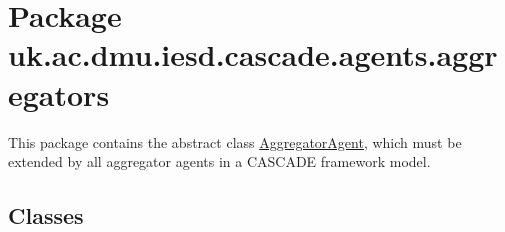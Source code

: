\hypertarget{namespaceuk_1_1ac_1_1dmu_1_1iesd_1_1cascade_1_1agents_1_1aggregators}{\section{Package uk.\-ac.\-dmu.\-iesd.\-cascade.\-agents.\-aggregators}
\label{namespaceuk_1_1ac_1_1dmu_1_1iesd_1_1cascade_1_1agents_1_1aggregators}
}


This package contains the abstract class \hyperlink{classuk_1_1ac_1_1dmu_1_1iesd_1_1cascade_1_1agents_1_1aggregators_1_1_aggregator_agent}{Aggregator\-Agent}, which must be extended by all aggregator agents in a C\-A\-S\-C\-A\-D\-E framework model.  


\subsection*{Classes}
